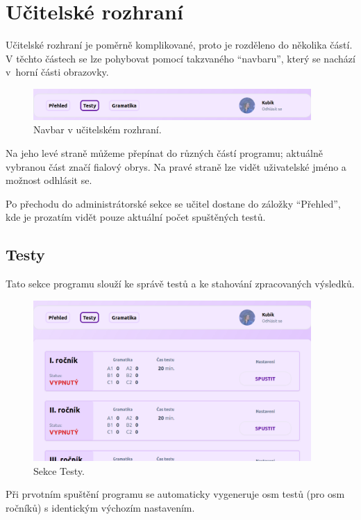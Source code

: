\section{Učitelské rozhraní}
\label{sec:admin}

Učitelské rozhraní je poměrně komplikované, proto je rozděleno do několika částí. V těchto částech se lze pohybovat pomocí takzvaného \enquote{navbaru}, který se nachází v~horní části obrazovky.

\begin{figure}[H]
    \centering
    \includegraphics[width=400px]{images/01design/navbar.png}
    \caption{Navbar v učitelském rozhraní.}
\end{figure}

Na jeho levé straně můžeme přepínat do různých částí programu; aktuálně vybranou část značí fialový obrys. Na pravé straně lze vidět uživatelské jméno a možnost odhlásit se.

Po přechodu do administrátorské sekce se učitel dostane do záložky \enquote{Přehled}, kde je prozatím vidět pouze aktuální počet spuštěných testů.

\subsection{Testy}

Tato sekce programu slouží ke správě testů a ke stahování zpracovaných výsledků.

\begin{figure}[H]
    \centering
    \includegraphics[width=400px]{images/01design/tests.png}
    \caption{Sekce Testy.}
\end{figure}

Při prvotním spuštění programu se automaticky vygeneruje osm testů (pro osm ročníků) s identickým výchozím nastavením. 

